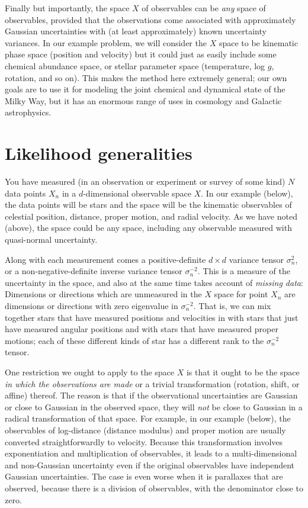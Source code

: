 \documentclass[12pt,pdftex,preprint]{aastex}
\begin{document}
Finally but importantly, the space $X$ of observables can be
\emph{any} space of observables, provided that the observations come
associated with approximately Gaussian uncertainties with (at least
approximately) known uncertainty variances.  In our example problem,
we will consider the $X$ space to be kinematic phase space (position
and velocity) but it could just as easily include some chemical
abundance space, or stellar parameter space (temperature, log $g$,
rotation, and so on).  This makes the method here extremely general;
our own goals are to use it for modeling the joint chemical and
dynamical state of the Milky Way, but it has an enormous range of uses
in cosmology and Galactic astrophysics.

\section{Likelihood generalities}

You have measured (in an observation or experiment or survey of some
kind) $N$ data points $X_n$ in a $d$-dimensional observable space $X$.
In our example (below), the data points will be stars and the space
will be the kinematic observables of celestial position, distance,
proper motion, and radial velocity.  As we have noted (above), the
space could be any space, including any observable measured with
quasi-normal uncertainty.

Along with each measurement comes a positive-definite $d\times d$
variance tensor $\sigma^2_n$, or a non-negative-definite inverse
variance tensor $\sigma^{-2}_n$.  This is a measure of the uncertainty
in the space, and also at the same time takes account of \emph{missing
  data}: Dimensions or directions which are unmeasured in the $X$
space for point $X_n$ are dimensions or directions with zero
eigenvalue in $\sigma^{-2}_n$.  That is, we can mix together stars
that have measured positions and velocities in with stars that just
have measured angular positions and with stars that have measured
proper motions; each of these different kinds of star has a different
rank to the $\sigma^{-2}_n$ tensor.

One restriction we ought to apply to the space $X$ is that it ought to
be the space \emph{in which the observations are made} or a trivial
transformation (rotation, shift, or affine) thereof.  The reason is
that if the observational uncertainties are Gaussian or close to
Gaussian in the observed space, they will \emph{not} be close to
Gaussian in a radical transformation of that space.  For example, in
our example (below), the observables of log-distance (distance
modulus) and proper motion are usually converted straightforwardly to
velocity.  Because this transformation involves exponentiation and
multiplication of observables, it leads to a multi-dimensional and
non-Gaussian uncertainty even if the original observables have
independent Gaussian uncertainties.  The case is even worse when it is
parallaxes that are observed, because there is a division of
observables, with the denominator close to zero.
\end{document}
